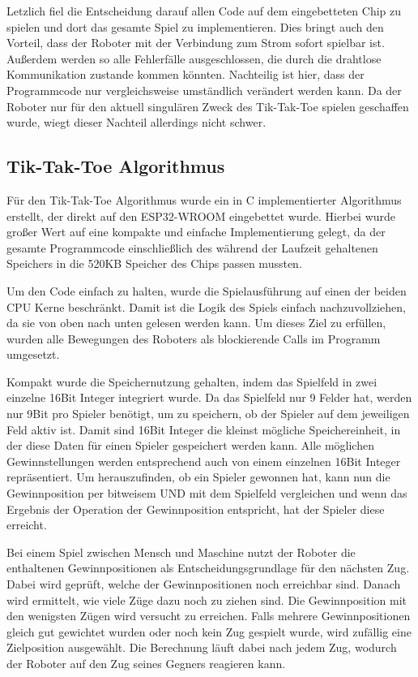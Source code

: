 \documentclass[conference,compsoc,final,a4paper]{IEEEtran}
\begin{document}
Letzlich fiel die Entscheidung darauf allen Code auf dem eingebetteten Chip zu spielen und dort
das gesamte Spiel zu implementieren. Dies bringt auch den Vorteil, dass der Roboter mit der Verbindung
zum Strom sofort spielbar ist. Außerdem werden so alle Fehlerfälle ausgeschlossen, die durch die
drahtlose Kommunikation zustande kommen könnten. Nachteilig ist hier, dass der Programmcode nur
vergleichsweise umständlich verändert werden kann. Da der Roboter nur für den aktuell singulären
Zweck des Tik-Tak-Toe spielen geschaffen wurde, wiegt dieser Nachteil allerdings nicht schwer.

\subsection{Tik-Tak-Toe Algorithmus}

Für den Tik-Tak-Toe Algorithmus wurde ein in C implementierter Algorithmus erstellt, der direkt auf
den ESP32-WROOM eingebettet wurde. Hierbei wurde großer Wert auf eine kompakte und einfache
Implementierung gelegt, da der gesamte Programmcode einschließlich des während der Laufzeit
gehaltenen Speichers in die 520KB Speicher des Chips passen mussten.

Um den Code einfach zu halten, wurde die Spielausführung auf einen der beiden CPU Kerne beschränkt.
Damit ist die Logik des Spiels einfach nachzuvollziehen, da sie von oben nach unten gelesen werden kann.
Um dieses Ziel zu erfüllen, wurden alle Bewegungen des Roboters als blockierende Calls im Programm
umgesetzt.

Kompakt wurde die Speichernutzung gehalten, indem das Spielfeld in zwei einzelne 16Bit Integer integriert wurde.
Da das Spielfeld nur 9 Felder hat, werden nur 9Bit pro Spieler benötigt, um zu speichern, ob der Spieler
auf dem jeweiligen Feld aktiv ist. Damit sind 16Bit Integer die kleinst mögliche Speichereinheit, in der
diese Daten für einen Spieler gespeichert werden kann. Alle möglichen Gewinnstellungen werden entsprechend
auch von einem einzelnen 16Bit Integer repräsentiert. Um herauszufinden, ob ein Spieler gewonnen hat, kann
nun die Gewinnposition per bitweisem UND mit dem Spielfeld vergleichen und wenn das Ergebnis der Operation
der Gewinnposition entspricht, hat der Spieler diese erreicht.

Bei einem Spiel zwischen Mensch und Maschine nutzt der Roboter die enthaltenen Gewinnpositionen als
Entscheidungsgrundlage für den nächsten Zug. Dabei wird geprüft, welche der Gewinnpositionen noch erreichbar
sind. Danach wird ermittelt, wie viele Züge dazu noch zu ziehen sind. Die Gewinnposition mit den
wenigsten Zügen wird versucht zu erreichen. Falls mehrere Gewinnpositionen gleich gut gewichtet wurden
oder noch kein Zug gespielt wurde, wird zufällig eine Zielposition ausgewählt. Die Berechnung läuft
dabei nach jedem Zug, wodurch der Roboter auf den Zug seines Gegners reagieren kann.
\end{document}
